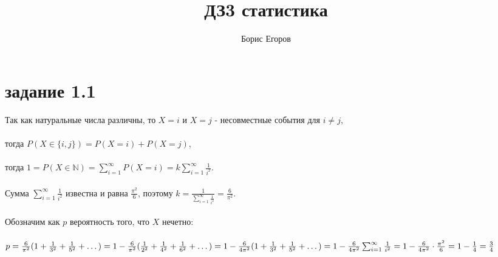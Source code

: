 \documentclass[a4paper]{article}
\author{Борис Егоров}
\title{ДЗ3 статистика}
\begin{document}
	\maketitle
	\section*{задание 1.1}
	\begin{large}
		Так как натуральные числа различны, то $X=i$ и $X=j$ - несовместные события для $i \ne j$,\\
		\\
		тогда $P(X \in \lbrace i,j \rbrace)=P(X=i)+P(X=j)$,\\
		\\
		тогда $1=P(X \in \mathbb{N})=\sum_{i=1}^{\infty}P(X=i) = k\sum_{i=1}^{\infty}\frac{1}{i^2}$.\\
		\\
		Сумма $\sum_{i=1}^{\infty}\frac{1}{i^2}$ известна и равна $\frac{\pi^2}{6}$, поэтому $k=\frac{1}{\sum_{i=1}^{\infty}\frac{1}{i^2}}=\frac{6}{\pi^2}$.\\
		\\
		Обозначим как $p$ вероятность того, что $X$ нечетно:\\
		\\
		$p=\frac{6}{\pi^2}(1+\frac{1}{3^2}+\frac{1}{5^2}+\dots)=\\
		\\
		1-\frac{6}{\pi^2}(\frac{1}{2^2}+\frac{1}{4^2}+\frac{1}{6^2}+\dots)=\\
		\\
		1-\frac{6}{4\pi^2}(1+\frac{1}{3^2}+\frac{1}{5^2}+\dots)=
		1-\frac{6}{4\pi^2}\sum_{i=1}^{\infty}\frac{1}{i^2}=1-\frac{6}{4\pi^2} \cdot \frac{\pi^2}{6}=1-\frac{1}{4}=\frac{3}{4}$\\
	\end{large}
	
	
	
	
	
	
	
	
	
\end{document}
